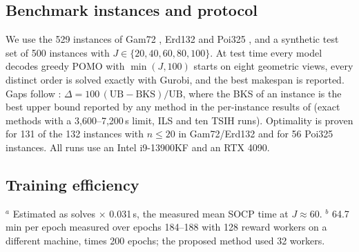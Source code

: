 \documentclass[preprint,review,12pt,authoryear]{elsarticle}
\begin{document}
\subsection{Benchmark instances and protocol}
We use the 529 instances of Gam72 \citep{gambella2018exact}, Erd132 \citep{erdogan2021exact} and Poi325
\citep{poikonen2020mothership}, and a synthetic test set of 500 instances with $J\in\{20,40,60,80,100\}$.
At test time every model decodes greedy POMO with $\min(J,100)$ starts on eight geometric views, every
distinct order is solved exactly with Gurobi, and the best makespan is reported. Gaps follow
\citet{li2025exact}: $\Delta = 100\,(\mathrm{UB}-\mathrm{BKS})/\mathrm{UB}$, where the BKS of an instance is the best
upper bound reported by any method in the per-instance results of \citet{li2025exact} (exact methods with a 3,600--7,200\,s
limit, ILS and ten TSIH runs). Optimality is proven for 131 of the 132 instances with $n\le20$ in Gam72/Erd132 and for
56 Poi325 instances. All runs use an Intel i9-13900KF and an RTX 4090.

\subsection{Training efficiency}
\begin{table}[t]\centering\small
\caption{Training budget and Real529 quality: POMO with exact Gurobi rewards (G200) versus the proposed method.}
\label{tab:budget}
\par\smallskip\raggedright\footnotesize
$^{a}$ Estimated as solves $\times$ 0.031\,s, the measured mean SOCP time at $J\approx60$.
$^{b}$ 64.7\,min per epoch measured over epochs 184--188 with 128 reward workers on a different machine, times 200 epochs; the proposed method used 32 workers.
\end{table}
\end{document}
